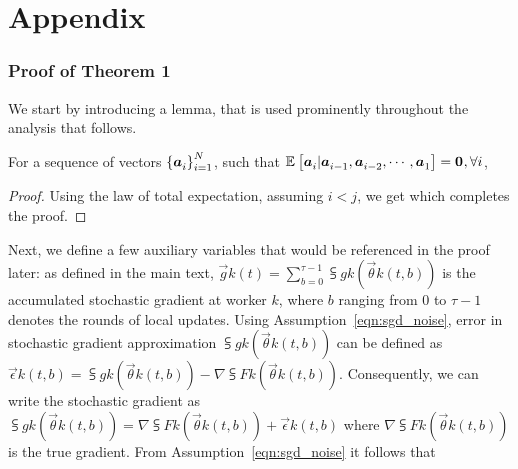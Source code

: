 \appendix
\vspace{-1.0in}
\part{Appendix}
\parttoc


\newpage
\section{Proof of Theorem 1}
\label{app:proof_1}

We start by introducing a lemma, that is used prominently throughout the analysis that follows.


\begin{lemma}
\label{lemma:exp_norm_sum}
For a sequence of vectors $\left\{\boldsymbol{a}_{i}^{}\right\}_{i=1}^{N}$, such that $\mathbb{E}_{}\left[\boldsymbol{a}_{i}^{}|\boldsymbol{a}_{i-1}^{}, \boldsymbol{a}_{i-2}^{},\cdots,\boldsymbol{a}_{1}^{}\right] = \boldsymbol{0}_{}^{}, \forall i$,
\end{lemma}
\begin{proof}
Using the law of total expectation, assuming $i<j$, we get 
which completes the proof.
\end{proof}

Next, we define a few auxiliary variables that would be referenced in the proof later: as defined in the main text, $\vec{g}{k}{(t)} = \sum_{b=0}^{\tau-1} \subsup{g}{k}{}(\vec{\theta}{k}{(t, b)})$ is the accumulated stochastic gradient at worker $k$, where $b$ ranging from $0$ to $\tau-1$ denotes the rounds of local updates. Using Assumption~\eqref{eqn:sgd_noise}, error in stochastic gradient approximation  $\subsup{g}{k}{}(\vec{\theta}{k}{(t, b)})$ can be defined as $\vec{\epsilon}{k}{(t, b)} = \subsup{g}{k}{}(\vec{\theta}{k}{(t, b)}) - \nabla\subsup{F}{k}{}(\vec{\theta}{k}{(t, b)})$. Consequently, we can write the stochastic gradient as $\subsup{g}{k}{}(\vec{\theta}{k}{(t, b)}) = \nabla\subsup{F}{k}{}(\vec{\theta}{k}{(t, b)}) + \vec{\epsilon}{k}{(t, b)}$ where $\nabla\subsup{F}{k}{}(\vec{\theta}{k}{(t, b)})$ is the true gradient. From Assumption~\eqref{eqn:sgd_noise} it follows that

